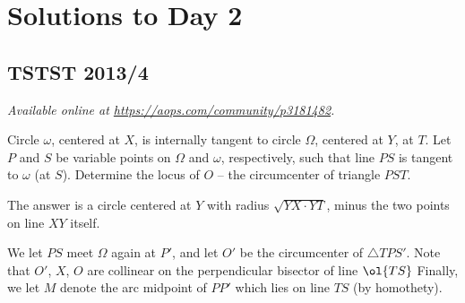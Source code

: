 \documentclass[11pt]{scrartcl}
\begin{document}
\section{Solutions to Day 2}
\subsection{TSTST 2013/4}
\textsl{Available online at \url{https://aops.com/community/p3181482}.}
\begin{mdframed}[style=mdpurplebox,frametitle={Problem statement}]
Circle $\omega$, centered at $X$, is internally tangent to circle $\Omega$,
centered at $Y$, at $T$.
Let $P$ and $S$ be variable points on $\Omega$ and $\omega$,
respectively, such that line $PS$ is tangent to $\omega$ (at $S$).
Determine the locus of $O$ -- the circumcenter of triangle $PST$.
\end{mdframed}
The answer is a circle centered at $Y$
with radius $\sqrt{YX \cdot YT}$,
minus the two points on line $XY$ itself.

We let $PS$ meet $\Omega$ again at $P'$,
and let $O'$ be the circumcenter of $\triangle TPS'$.
Note that $O'$, $X$, $O$ are collinear on the perpendicular
bisector of line $\ol{TS}$
Finally, we let $M$ denote the arc midpoint of $PP'$
which lies on line $TS$ (by homothety).
\end{document}
